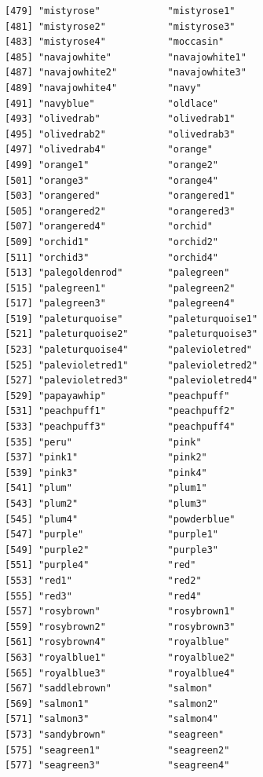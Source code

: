 \documentclass[
  a4paper,
]{article}
\begin{document}
\begin{verbatim}
[479] "mistyrose"            "mistyrose1"          
[481] "mistyrose2"           "mistyrose3"          
[483] "mistyrose4"           "moccasin"            
[485] "navajowhite"          "navajowhite1"        
[487] "navajowhite2"         "navajowhite3"        
[489] "navajowhite4"         "navy"                
[491] "navyblue"             "oldlace"             
[493] "olivedrab"            "olivedrab1"          
[495] "olivedrab2"           "olivedrab3"          
[497] "olivedrab4"           "orange"              
[499] "orange1"              "orange2"             
[501] "orange3"              "orange4"             
[503] "orangered"            "orangered1"          
[505] "orangered2"           "orangered3"          
[507] "orangered4"           "orchid"              
[509] "orchid1"              "orchid2"             
[511] "orchid3"              "orchid4"             
[513] "palegoldenrod"        "palegreen"           
[515] "palegreen1"           "palegreen2"          
[517] "palegreen3"           "palegreen4"          
[519] "paleturquoise"        "paleturquoise1"      
[521] "paleturquoise2"       "paleturquoise3"      
[523] "paleturquoise4"       "palevioletred"       
[525] "palevioletred1"       "palevioletred2"      
[527] "palevioletred3"       "palevioletred4"      
[529] "papayawhip"           "peachpuff"           
[531] "peachpuff1"           "peachpuff2"          
[533] "peachpuff3"           "peachpuff4"          
[535] "peru"                 "pink"                
[537] "pink1"                "pink2"               
[539] "pink3"                "pink4"               
[541] "plum"                 "plum1"               
[543] "plum2"                "plum3"               
[545] "plum4"                "powderblue"          
[547] "purple"               "purple1"             
[549] "purple2"              "purple3"             
[551] "purple4"              "red"                 
[553] "red1"                 "red2"                
[555] "red3"                 "red4"                
[557] "rosybrown"            "rosybrown1"          
[559] "rosybrown2"           "rosybrown3"          
[561] "rosybrown4"           "royalblue"           
[563] "royalblue1"           "royalblue2"          
[565] "royalblue3"           "royalblue4"          
[567] "saddlebrown"          "salmon"              
[569] "salmon1"              "salmon2"             
[571] "salmon3"              "salmon4"             
[573] "sandybrown"           "seagreen"            
[575] "seagreen1"            "seagreen2"           
[577] "seagreen3"            "seagreen4"           

\end{verbatim}
\end{document}
